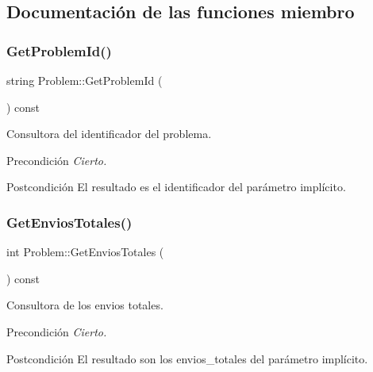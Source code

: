 \subsection{Documentación de las funciones miembro}
\mbox{\label{class_problem_a953ef8047cd489d36f4a96d10baed4af}} 
\subsubsection{\texorpdfstring{Get\+Problem\+Id()}{GetProblemId()}}
{\footnotesize\ttfamily string Problem\+::\+Get\+Problem\+Id (\begin{DoxyParamCaption}{ }\end{DoxyParamCaption}) const}



Consultora del identificador del problema. 

\begin{DoxyPrecond}{Precondición}
{\itshape Cierto.} 
\end{DoxyPrecond}
\begin{DoxyPostcond}{Postcondición}
El resultado es el identificador del parámetro implícito. 
\end{DoxyPostcond}
\mbox{\label{class_problem_af97fede267d1b9881854f7d8da7be49a}} 
\subsubsection{\texorpdfstring{Get\+Envios\+Totales()}{GetEnviosTotales()}}
{\footnotesize\ttfamily int Problem\+::\+Get\+Envios\+Totales (\begin{DoxyParamCaption}{ }\end{DoxyParamCaption}) const}



Consultora de los envios totales. 

\begin{DoxyPrecond}{Precondición}
{\itshape Cierto.} 
\end{DoxyPrecond}
\begin{DoxyPostcond}{Postcondición}
El resultado son los envios\+\_\+totales del parámetro implícito. 
\end{DoxyPostcond}
\mbox{\label{class_problem_aff1a49d7c06873886905fc01b5ca024c}} 
